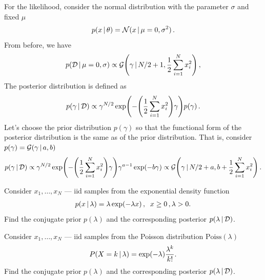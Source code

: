\begin{example}
    For the likelihood, consider the normal distribution with the parameter $\sigma$ and fixed $\mu$
    \begin{align}
        p(x\,|\, \theta) = \mathcal{N}(x\,|\, \mu=0,\sigma^2)\,.
    \end{align}
    From before, we have
    \begin{align}
    p(\mathcal{D}\cond \mu=0, \sigma) \propto \mathcal{G}\left(\gamma\cond N/2+1, \frac{1}{2}\sum_{i=1}^Nx_i^2\right)\,,
    \end{align}
    The posterior distribution is defined as
    \begin{align}
        p(\gamma \cond \mathcal{D}) \propto \gamma^{N/2}\exp\left(-\left(\frac{1}{2}\sum_{i=1}^Nx_i^2\right)\gamma\right)p(\gamma)\,.
    \end{align}
    Let's choose the prior distribution $p(\gamma)$ so that the functional form of the posterior distribution is the same as of the prior distribution.
    That is, consider $p(\gamma) = \mathcal{G}(\gamma\,|\, a,b)$
    \begin{align}
        p(\gamma \cond \mathcal{D}) \propto \gamma^{N/2}\exp\left(-\left(\frac{1}{2}\sum_{i=1}^Nx_i^2\right)\gamma\right)\gamma^{a-1}\exp(-b\gamma) \propto \mathcal{G}\left(\gamma\cond N/2+a, b+\frac{1}{2}\sum_{i=1}^Nx_i^2\right)\,.
    \end{align}
\end{example}

\begin{exercise}
    Consider $x_1,\ldots,x_N$ --- iid samples from the exponential density function
    \begin{align}
        p(x\,|\, \lambda) = \lambda\exp(-\lambda x)\,, \;\; x \geq 0\,, \lambda > 0.
    \end{align}
    Find the conjugate prior $p(\lambda)$ and the corresponding posterior $p(\lambda\,|\, \mathcal{D})$.
\end{exercise}

\begin{exercise}
    Consider $x_1,\ldots,x_N$ --- iid samples from the Poisson distribution $\text{Poiss}(\lambda)$
    \begin{align}
        P(X = k\,|\, \lambda) = \exp(-\lambda)\frac{\lambda^k}{k!}.
    \end{align}
    Find the conjugate prior $p(\lambda)$ and the corresponding posterior $p(\lambda\,|\, \mathcal{D})$.
\end{exercise}

